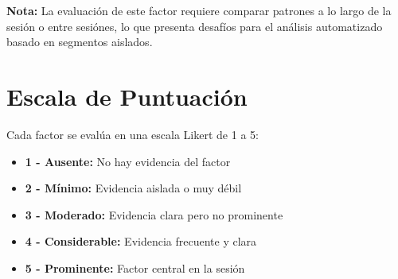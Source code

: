 \documentclass[12pt,a4paper,twoside]{book}
\begin{document}
\textbf{Nota:} La evaluación de este factor requiere comparar patrones a lo largo de la sesión o entre sesiónes, lo que presenta desafíos para el análisis automatizado basado en segmentos aislados.

\section{Escala de Puntuación}

Cada factor se evalúa en una escala Likert de 1 a 5:

\begin{itemize}
    \item \textbf{1 - Ausente:} No hay evidencia del factor
    \item \textbf{2 - Mínimo:} Evidencia aislada o muy débil
    \item \textbf{3 - Moderado:} Evidencia clara pero no prominente
    \item \textbf{4 - Considerable:} Evidencia frecuente y clara
    \item \textbf{5 - Prominente:} Factor central en la sesión
\end{itemize}
\end{document}
